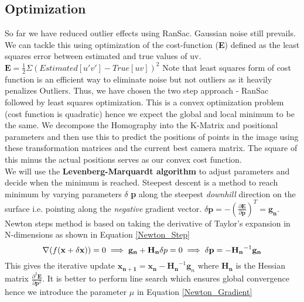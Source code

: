 \documentclass[titlepage]{article}
\begin{document}
\subsection{Optimization}
So far we have reduced outlier effects using RanSac. Gaussian noise still prevails. We can tackle this using optimization of the cost-function (\textbf{E}) defined as the least squares error between estimated and true values of uv. $\mathbf{E} =\frac{1}{2} \Sigma(Estimated [u'v'] - True [u v])^2$
Note that least squares form of cost function is an efficient way to eliminate noise but not outliers as it heavily penalizes Outliers. Thus, we have chosen the two step approach - RanSac followed by least squares optimization. This is a convex optimization problem (cost function is quadratic) hence we expect the global and local minimum to be the same. We decompose the Homography into the K-Matrix and positional parameters and then use this to predict the positions of points in the image using these transformation matrices and the current best camera matrix. The square of this minus the actual positions serves as our convex cost function.\\
We will use the \textbf{Levenberg-Marquardt algorithm} to adjust parameters and decide when the minimum is reached. Steepest descent is a method to reach minimum by varying parameters $\delta$ \textbf{p} along the steepest \textit{downhill} direction on the surface i.e. pointing along the \textit{negative} gradient vector. $\delta \mathbf{p} = -(\frac{\partial \mathbf{E}}{\partial\mathbf{p}})^T = \mathbf{g_n}$.
%  
Newton steps method is based on taking the derivative of Taylor's expansion in N-dimensions as shown in Equation \ref{Newton_Step}   
\begin{equation}
  \label{Newton_Step}
  \nabla (f(\textbf{x}+\delta\textbf{x}))=0 \implies \mathbf{g_n} + \mathbf{H_n} \delta p = 0\\
  \implies \delta{\mathbf{p}}=-\mathbf{H_n}^{-1}\mathbf{g_n}
\end{equation}
This gives the iterative update $\mathbf{x_{n+1}}=\mathbf{x_n}-\mathbf{H_n}^{-1} \mathbf{g}_n$ where $\mathbf{H_n}$ is the Hessian matrix $\frac{\partial^2 \mathbf{E}}{\partial \mathbf{p}^2}$. It is better to perform line search which ensures global convergence hence we introduce the parameter $\mu$ in Equation \ref{Newton_Gradient}
\end{document}
